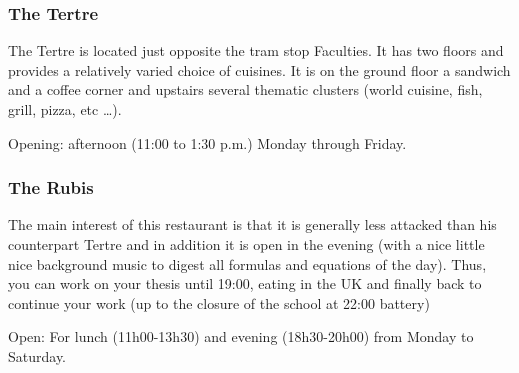 \subsubsection{The Tertre}


The Tertre is located just opposite the tram stop Faculties. It has two floors and provides a relatively varied choice of cuisines.
It is on the ground floor a sandwich and a coffee corner and upstairs several thematic clusters (world cuisine, fish, grill, pizza, etc \dots).

Opening: afternoon (11:00 to 1:30 p.m.) Monday through Friday.
\subsubsection{The Rubis}



The main interest of this restaurant is that it is generally less attacked than his counterpart Tertre and in addition it is open in the evening (with a nice little nice background music to digest all formulas and equations of the day).
Thus, you can work on your thesis until 19:00, eating in the UK and finally back to continue your work (up to the closure of the school at 22:00 battery)

Open: For lunch (11h00-13h30) and evening (18h30-20h00) from Monday to Saturday.


